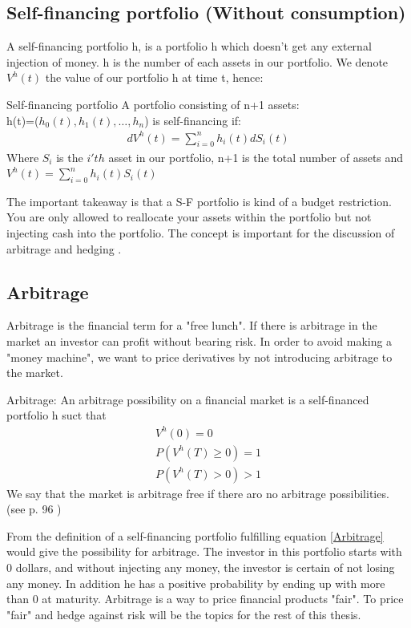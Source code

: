 \subsection{Self-financing portfolio (Without consumption)}
A self-financing portfolio h, is a portfolio h which doesn't get any external injection of money. h is the number of each assets in our portfolio. We denote $V^{h}(t)$ the value of our portfolio h at time t, hence:
\theoremstyle{definition}
\begin{definition}{Self-financing portfolio}
A portfolio consisting of n+1 assets: \\
h(t)=($h_0(t),h_1(t), \dotsc, h_{n}$) is self-financing if:
\begin{equation}\label{SF}
\begin{split}
dV^{h}(t)=\sum_{i=0}^{n} h_{i}(t) dS_{i}(t)
\end{split}
\end{equation}
Where $S_{i}$ is the $i'th$ asset in our portfolio, n+1 is the total number of assets and\\
$V^{h}(t)=\sum_{i=0}^{n} h_{i}(t) S_{i}(t)$
\end{definition}
The important takeaway is that a S-F portfolio is kind of a budget restriction. You are only allowed to reallocate your assets within the portfolio but not injecting cash into the portfolio. The concept is important for the discussion of arbitrage and hedging \parencite{finKont}.

\subsection{Arbitrage}
Arbitrage is the financial term for a "free lunch". If there is arbitrage in the market an investor can profit without bearing risk. In order to avoid making a "money machine", we want to price derivatives by not introducing arbitrage to the market.  
\theoremstyle{definition}
\begin{definition}{Arbitrage:}
An arbitrage possibility on a financial market is a self-financed portfolio h suct that
\begin{equation}\label{Arbitrage}
\begin{split}
V^{h}(0)=0\\
P(V^{h}(T)\geq 0)=1\\
P(V^{h}(T)>0)>1
\end{split}
\end{equation}
We say that the market is arbitrage free if there aro no arbitrage possibilities.\\
(see p. 96 \parencite{finKont})
\end{definition}
From the definition of a self-financing portfolio fulfilling equation \eqref{Arbitrage} would give the possibility for arbitrage. The investor in this portfolio starts with 0 dollars, and without injecting any money, the investor is certain of not losing any money. In addition he has a positive probability by ending up with more than 0 at maturity. Arbitrage is a way to price financial products "fair". To price "fair" and hedge against risk will be the topics for the rest of this thesis.

